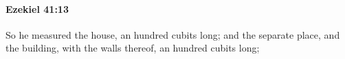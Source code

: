 
		\paragraph{Ezekiel 41:13} %
			\label{EZEKIEL-41-13}

			So he measured the house, an hundred cubits long; and the separate place, and the building, with the walls thereof, an hundred cubits long;


